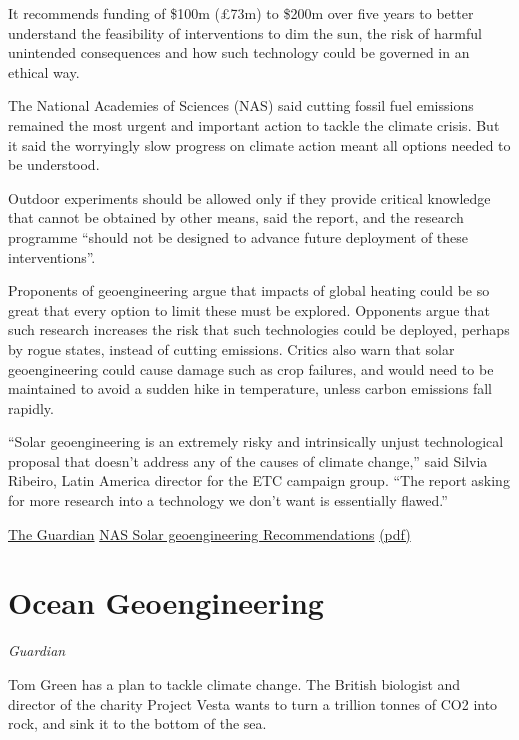 \documentclass[
]{book}
\begin{document}
It recommends funding of \$100m (£73m) to \$200m over five years to better understand the feasibility of interventions to dim the sun, the risk of harmful unintended consequences and how such technology could be governed in an ethical way.

The National Academies of Sciences (NAS) said cutting fossil fuel emissions remained the most urgent and important action to tackle the climate crisis. But it said the worryingly slow progress on climate action meant all options needed to be understood.

Outdoor experiments should be allowed only if they provide critical knowledge that cannot be obtained by other means, said the report, and the research programme ``should not be designed to advance future deployment of these interventions''.

Proponents of geoengineering argue that impacts of global heating could be so great that every option to limit these must be explored. Opponents argue that such research increases the risk that such technologies could be deployed, perhaps by rogue states, instead of cutting emissions. Critics also warn that solar geoengineering could cause damage such as crop failures, and would need to be maintained to avoid a sudden hike in temperature, unless carbon emissions fall rapidly.

``Solar geoengineering is an extremely risky and intrinsically unjust technological proposal that doesn't address any of the causes of climate change,'' said Silvia Ribeiro, Latin America director for the ETC campaign group. ``The report asking for more research into a technology we don't want is essentially flawed.''

\href{https://www.theguardian.com/environment/2021/mar/25/top-us-scientists-back-100m-geoengineering-research-proposal}{The Guardian}
\href{https://www.nap.edu/download/25762}{NAS Solar geoengineering Recommendations}
\href{pdf/NAS_2021_Sun_Geoengineering.pdf}{(pdf)}

\hypertarget{ocean-geoengineering}{%
\section{Ocean Geoengineering}\label{ocean-geoengineering}}

\emph{Guardian}

Tom Green has a plan to tackle climate change. The British biologist and director of the charity Project Vesta wants to turn a trillion tonnes of CO2 into rock, and sink it to the bottom of the sea.
\end{document}
